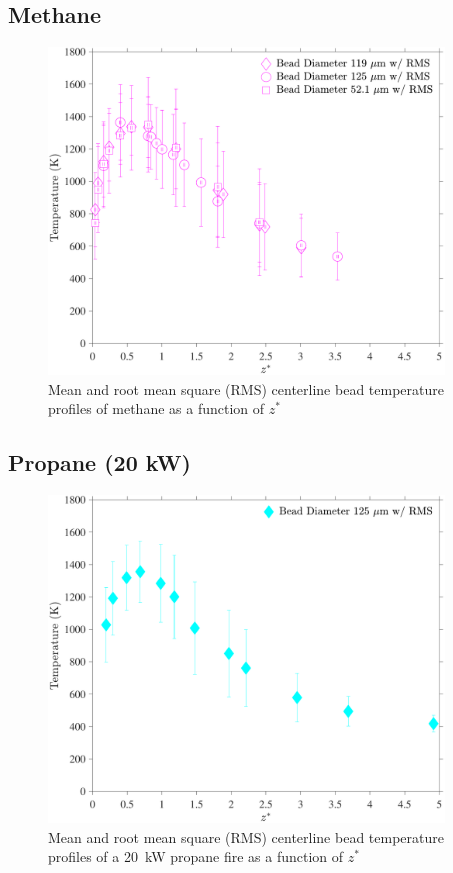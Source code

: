 \documentclass[12pt]{article}
\begin{document}
\pagebreak

\subsection{Methane}
\label{ssec:Methane_Bead_Temp}
\begin{figure}[!h]
	\centering
\includegraphics[width=10.5cm,keepaspectratio]{Methane_Bead_Temperature.pdf}
	\caption[Mean and RMS centerline bead temperature profile of methane]{Mean and root mean square (RMS) centerline bead temperature profiles of methane as a function of $z^*$}
	\label{fig:Methane_Bead_Temp}
\end{figure}

\pagebreak

\subsection{Propane (20 kW)}
\label{ssec:Propane20KW_Bead_Temp}
\begin{figure}[!h]
	\centering
\includegraphics[width=10.5cm,keepaspectratio]{Propane 20KW_Bead_Temperature.pdf}
	\caption[Mean and RMS centerline bead temperature profile of a 20~kW propane fire]{Mean and root mean square (RMS) centerline bead temperature profiles of a 20~kW propane fire as a function of $z^*$}
	\label{fig:Propane20KW_Bead_Temp}
\end{figure}
\end{document}
